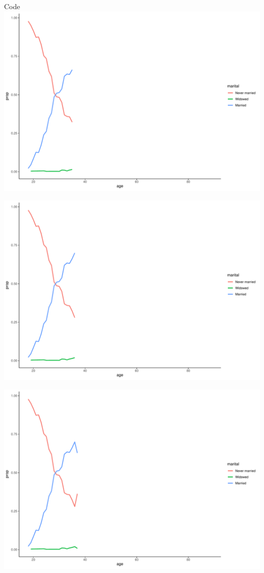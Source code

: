\documentclass[
  ignorenonframetext,
]{beamer}
\begin{document}
\begin{frame}[fragile]{Code}
\includegraphics{gss_cat_files/figure-beamer/unnamed-chunk-1-29.pdf}

\includegraphics{gss_cat_files/figure-beamer/unnamed-chunk-1-30.pdf}

\includegraphics{gss_cat_files/figure-beamer/unnamed-chunk-1-31.pdf}


\end{frame}
\end{document}
